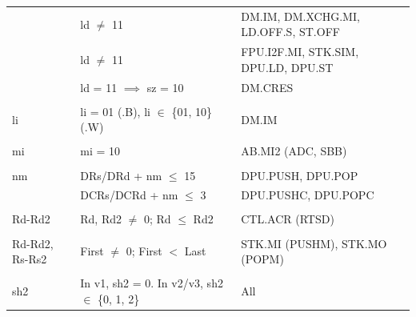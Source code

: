 \begin{table}
\begin{center}
\begin{tabular}{lll}
                 & ld $\ne$ 11                                      & DM.IM, DM.XCHG.MI, LD.OFF.S, ST.OFF               \\
                 & ld $\ne$ 11                                      & FPU.I2F.MI, STK.SIM, DPU.LD, DPU.ST               \\
                 & ld = 11 $\implies$ sz = 10                       & DM.CRES                                           \\
                 &                                                  &                                                   \\
li               & li = 01 (.B), li $\in$ \{01, 10\} (.W)           & DM.IM                                             \\
                 &                                                  &                                                   \\
mi               & mi = 10                                          & AB.MI2 (ADC, SBB)                                 \\
                 &                                                  &                                                   \\
nm               & DRs/DRd + nm $\le$ 15                            & DPU.PUSH, DPU.POP                                 \\
                 & DCRs/DCRd + nm $\le$ 3                           & DPU.PUSHC, DPU.POPC                               \\
                 &                                                  &                                                   \\
Rd-Rd2           & Rd, Rd2 $\ne$ 0; Rd $\le$ Rd2                    & CTL.ACR (RTSD)                                    \\
                 &                                                  &                                                   \\
Rd-Rd2, Rs-Rs2   & First $\ne$ 0; First $<$ Last                    & STK.MI (PUSHM), STK.MO (POPM)                     \\
                 &                                                  &                                                   \\
sh2              & In v1, sh2 = 0. In v2/v3, sh2 $\in$ \{0, 1, 2\}  & All                                               \\

\end{tabular}
\end{center}
\end{table}
